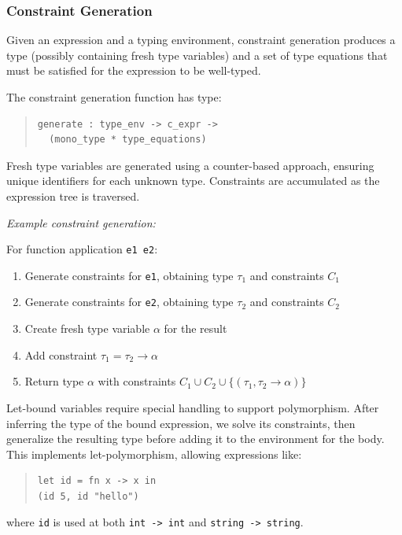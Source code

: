 \documentclass[conference,onecolumn]{IEEEtran}
\begin{document}
\subsubsection{Constraint Generation}

Given an expression and a typing environment, constraint generation produces a type (possibly containing fresh type variables) and a set of type equations that must be satisfied for the expression to be well-typed.

The constraint generation function has type:
\begin{quote}
\small
\begin{verbatim}
generate : type_env -> c_expr -> 
  (mono_type * type_equations)
\end{verbatim}
\end{quote}

Fresh type variables are generated using a counter-based approach, ensuring unique identifiers for each unknown type. Constraints are accumulated as the expression tree is traversed.

\textit{Example constraint generation:}

For function application \texttt{e1 e2}:
\begin{enumerate}
\item Generate constraints for \texttt{e1}, obtaining type $\tau_1$ and constraints $C_1$
\item Generate constraints for \texttt{e2}, obtaining type $\tau_2$ and constraints $C_2$
\item Create fresh type variable $\alpha$ for the result
\item Add constraint $\tau_1 = \tau_2 \to \alpha$
\item Return type $\alpha$ with constraints $C_1 \cup C_2 \cup \{(\tau_1, \tau_2 \to \alpha)\}$
\end{enumerate}

Let-bound variables require special handling to support polymorphism. After inferring the type of the bound expression, we solve its constraints, then generalize the resulting type before adding it to the environment for the body. This implements let-polymorphism, allowing expressions like:

\begin{quote}
\small
\begin{verbatim}
let id = fn x -> x in
(id 5, id "hello")
\end{verbatim}
\end{quote}

where \texttt{id} is used at both \texttt{int -> int} and \texttt{string -> string}.
\end{document}
